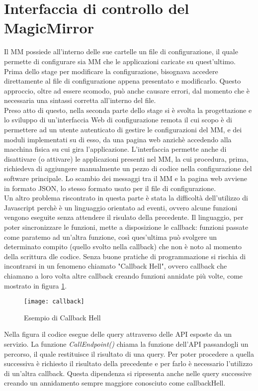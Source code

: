\section{Interfaccia di controllo del MagicMirror}\label{cap:interfacciaproblemi}
Il MM possiede all'interno delle sue cartelle un file di configurazione, il quale permette
di configurare sia MM che le applicazioni caricate su quest'ultimo.
Prima dello stage per modificare la configurazione, bisognava accedere direttamente al file di configurazione
appena presentato e modificarlo. Questo approccio, oltre ad essere scomodo, pu\`o anche
causare errori, dal momento che \`e necessaria una sintassi corretta all'interno del file.\\[1\baselineskip]
Preso atto di questo, nella seconda parte dello stage si \`e svolta la progettazione e lo sviluppo di un'interfaccia Web di configurazione remota
il cui scopo \`e di permettere ad un utente autenticato di gestire
le configurazioni del MM, e dei moduli implementati su di esso, da una pagina web
anzich\`e accedendo alla macchina fisica su cui gira l'applicazione.
L'interfaccia permette anche di disattivare (o attivare) le applicazioni presenti nel MM,
la cui procedura, prima, richiedeva di aggiungere manualmente un pezzo di codice nella
configurazione del software principale.
Lo scambio dei messaggi tra il MM e la pagina web avviene in formato JSON, lo stesso formato
usato per il file di configurazione.\\
Un altro problema riscontrato in questa parte \`e stata la difficolt\`a dell'utilizzo di Javascript
perch\`e \`e un linguaggio orientato ad eventi, ovvero alcune funzioni vengono eseguite senza attendere
il risulato della precedente. Il linguaggio, per poter sincronizzare le funzioni, mette a disposizione
le callback: funzioni passate come paratemo ad un'altra funzione, così
ques'ultima può svolgere un determinato compito (quello svolto nella callback) che non \`e noto al momento
della scrittura dle codice.
Senza buone pratiche di programmazione si rischia di incontrarsi in un fenomeno chiamato "Callback Hell", ovvero callback che chiamano a loro volta
altre callback creando funzioni annidate pi\`u volte, come mostrato in figura \ref{fig:hell}.
\begin{figure}[H]
    \texttt{[image: callback]}
    \caption{Esempio di Callback Hell}
    \label{fig:hell}
\end{figure}
Nella figura il codice esegue delle query attraverso delle API esposte da un servizio. La funzione \textit{CallEndpoint()} chiama la funzione dell'API passandogli
un percorso, il quale restituisce il risultato di una query. Per poter procedere a quella successiva \`e richiesto il risultato della precedente e
per farlo \`e necessario l'utilizzo di un'altra callback. Questa dipendenza si ripresenta anche nelle query successive creando un annidamento
sempre maggiore conosciuto come callbackHell.
